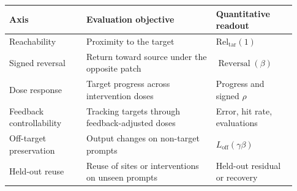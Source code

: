 \begin{tabular}{@{}
>{\raggedright\arraybackslash}p{0.25\linewidth}
>{\raggedright\arraybackslash}p{0.42\linewidth}
>{\raggedright\arraybackslash}p{0.26\linewidth}@{}}
\toprule
Axis & Evaluation objective & Quantitative readout \\
\midrule
Reachability
& Proximity to the target
& $\mathrm{Rel}_{\mathrm{tar}}(1)$ \\

Signed reversal
& Return toward source under the opposite patch
& $\operatorname{Reversal}(\beta)$ \\

Dose response
& Target progress across intervention doses
& Progress and signed $\rho$ \\

Feedback controllability
& Tracking targets through feedback-adjusted doses
& Error, hit rate, evaluations \\

Off-target preservation
& Output changes on non-target prompts
& $L_{\mathrm{off}}(\gamma\beta)$ \\

Held-out reuse
& Reuse of sites or interventions on unseen prompts
& Held-out residual or recovery \\
\bottomrule
\end{tabular}

